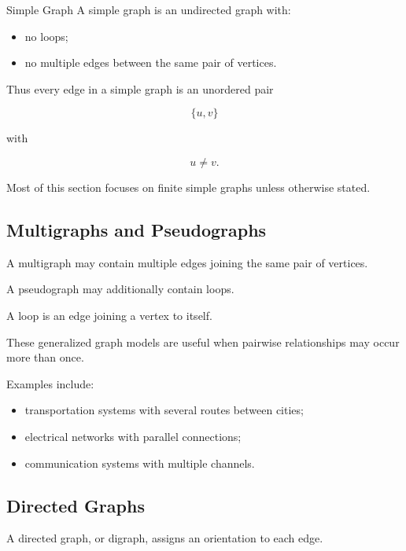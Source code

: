 \begin{definitionbox}{Simple Graph}
A simple graph is an undirected graph with:
\begin{itemize}
    \item no loops;
    \item no multiple edges between the same pair of vertices.
\end{itemize}
\end{definitionbox}

Thus every edge in a simple graph is an unordered pair

\[
\{u,v\}
\]

with

\[
u\neq v.
\]

Most of this section focuses on finite simple graphs unless otherwise
stated.

\subsection{Multigraphs and Pseudographs}
\label{subsec:multigraphs-pseudographs}

A multigraph may contain multiple edges joining the same pair of
vertices.

A pseudograph may additionally contain loops.

A loop is an edge joining a vertex to itself.

These generalized graph models are useful when pairwise relationships
may occur more than once.

Examples include:

\begin{itemize}
    \item transportation systems with several routes between cities;
    \item electrical networks with parallel connections;
    \item communication systems with multiple channels.
\end{itemize}

\subsection{Directed Graphs}
\label{subsec:directed-graphs}

A directed graph, or digraph, assigns an orientation to each edge.


